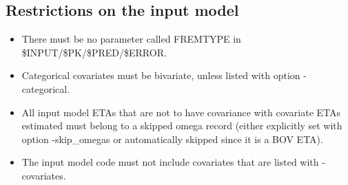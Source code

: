 \subsection{Restrictions on the input model}
\begin{itemize}
	\item There must be no parameter called FREMTYPE in \$INPUT/\$PK/\$PRED/\$ERROR.
	\item Categorical covariates must be bivariate, unless listed with option -categorical.
    \item All input model ETAs that are not to have covariance with covariate ETAs estimated must
    belong to a skipped omega record (either explicitly set with option -skip\_omegas or
    automatically skipped since it is a BOV ETA).
    \item The input model code must not include covariates that are listed with 
    -covariates.
\end{itemize}

